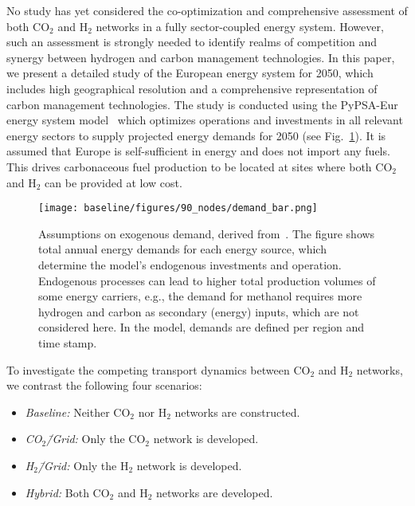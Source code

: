 \documentclass[twocolumn]{article}
\newcommand{\carbon}{CO$_2$}
\newcommand{\hydrogen}{H$_2$}
\newcommand{\carbongrid}{CO$_2$\=/Grid}
\newcommand{\hydrogengrid}{H$_2$\=/Grid}
\begin{document}
No study has yet considered the co-optimization and comprehensive assessment of both \carbon{} and \hydrogen{} networks in a fully sector-coupled energy system. However, such an assessment is strongly needed to identify realms of competition and synergy between hydrogen and carbon management technologies. In this paper, we present a detailed study of the European energy system for 2050, which includes high geographical resolution and a comprehensive representation of carbon management technologies. The study is conducted using the PyPSA-Eur energy system model~\cite{brownPyPSAEurOpenSectorcoupled2023} which optimizes operations and investments in all relevant energy sectors to supply projected energy demands for 2050 (see Fig.~\ref{fig:total-demand-bar}). It is assumed that Europe is self-sufficient in energy and does not import any fuels. This drives carbonaceous fuel production to be located at sites where both \carbon{} and \hydrogen{} can be provided at low cost.

\begin{figure}[h!]
    \texttt{[image: baseline/figures/90\_nodes/demand\_bar.png]}
    \caption{Assumptions on exogenous demand, derived from~\cite{piamanzGeoreferencedIndustrialSites2018,muehlenpfordtTimeSeries2019,mantzosJRCIDEES20152018,NationalEmissionsReported2023,EurostatCompleteEnergyBalance,uwekrienDemandlib2023}. The figure shows total annual energy demands for each energy source, which determine the model's endogenous investments and operation. Endogenous processes can lead to higher total production volumes of some energy carriers, e.g., the demand for methanol requires more hydrogen and carbon as secondary (energy) inputs, which are not considered here. In the model, demands are defined per region and time stamp.}
    \label{fig:total-demand-bar}
\end{figure}




To investigate the competing transport dynamics between \carbon{} and \hydrogen{} networks, we contrast the following four scenarios:
%
\begin{itemize}
    \item[] \textit{Baseline:} Neither \carbon{} nor \hydrogen{} networks are constructed.
    \item[] \textit{\carbongrid{}:} Only the \carbon{} network is developed.
    \item[] \textit{\hydrogengrid{}:} Only the \hydrogen{} network is developed.
    \item[] \textit{Hybrid:} Both \carbon{} and \hydrogen{} networks are developed.
\end{itemize}
\end{document}
